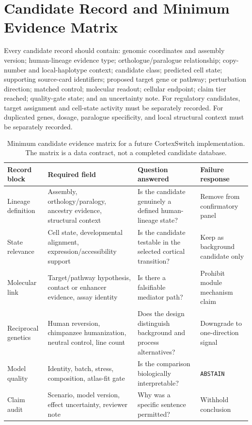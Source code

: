 \documentclass[conference]{IEEEtran}
\newcommand{\abstain}{\texttt{ABSTAIN}}
\begin{document}
\section{Candidate Record and Minimum Evidence Matrix}

Every candidate record should contain: genomic coordinates and assembly version; human-lineage evidence type; orthologue/paralogue relationship; copy-number and local-haplotype context; candidate class; predicted cell state; supporting source-card identifiers; proposed target gene or pathway; perturbation direction; matched control; molecular readout; cellular endpoint; claim tier reached; quality-gate state; and an uncertainty note. For regulatory candidates, target assignment and cell-state activity must be separately recorded. For duplicated genes, dosage, paralogue specificity, and local structural context must be separately recorded.

\begin{table}[t]
\caption{Minimum candidate evidence matrix for a future CortexSwitch implementation. The matrix is a data contract, not a completed candidate database.}
\label{tab:matrix}
\centering
\footnotesize
\renewcommand{\arraystretch}{1.12}
\begin{tabular}{|p{}|p{}|p{}|p{}|}
\hline
\textbf{Record block} & \textbf{Required field} & \textbf{Question answered} & \textbf{Failure response} \\
\hline
Lineage definition & Assembly, orthology/paralogy, ancestry evidence, structural context & Is the candidate genuinely a defined human-lineage state? & Remove from confirmatory panel \\
\hline
State relevance & Cell state, developmental alignment, expression/accessibility support & Is the candidate testable in the selected cortical transition? & Keep as background candidate only \\
\hline
Molecular link & Target/pathway hypothesis, contact or enhancer evidence, assay identity & Is there a falsifiable mediator path? & Prohibit module mechanism claim \\
\hline
Reciprocal genetics & Human reversion, chimpanzee humanization, neutral control, line count & Does the design distinguish background and process alternatives? & Downgrade to one-direction signal \\
\hline
Model quality & Identity, batch, stress, composition, atlas-fit gate & Is the comparison biologically interpretable? & \abstain{} \\
\hline
Claim audit & Scenario, model version, effect uncertainty, reviewer note & Why was a specific sentence permitted? & Withhold conclusion \\
\hline
\end{tabular}
\end{table}
\end{document}
